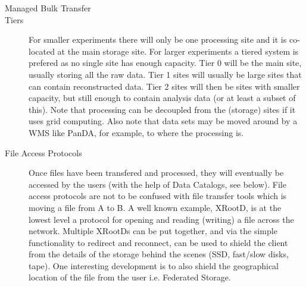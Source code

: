 \begin{description}
\item[Managed Bulk Transfer]

 

\item[Tiers] For smaller experiments there will only be one processing site and it is co-located at the main storage site. For larger experiments 
a tiered system is prefered as no single site has enough capacity. Tier 0 will be the main site, usually storing all the raw data. Tier 1 sites will 
usually be large sites that can contain reconstructed data. Tier 2 sites will then be sites with smaller capacity, but still enough to contain 
analysis data (or at least a subset of this). Note that processing can be decoupled from the (storage) sites if it uses grid computing. Also note 
that data sets may be moved around by a WMS like PanDA, for example, to where the processing is.  

\item[File Access Protocols] Once files have been transfered and processed, they will eventually be accessed by the users (with the help of 
Data Catalogs, see below). File access protocols are not to be confused with file transfer tools which is moving a file from A to B. 
A well known example, XRootD, is at the lowest level a protocol for opening and reading (writing) a file across the network. Multiple XRootDs can 
be put together, and via the simple functionality to redirect and reconnect, can be used to shield the client from the details of the storage 
behind the scenes (SSD, fast/slow disks, tape). One interesting development is to also shield the geographical location of the file from the user i.e. 
Federated Storage.


\end{description}
